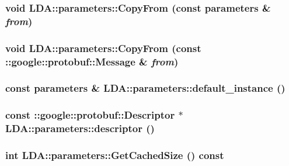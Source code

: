 \label{class_l_d_a_1_1parameters_ae528875970511c508f159074dcd3f25f}
\hypertarget{class_l_d_a_1_1parameters_aced52857cb4b43b1a500ef9f686bbfda}{
\subsubsection[{CopyFrom}]{\setlength{\rightskip}{0pt plus 5cm}void LDA::parameters::CopyFrom (const {\bf parameters} \& {\em from})}}
\label{class_l_d_a_1_1parameters_aced52857cb4b43b1a500ef9f686bbfda}
\hypertarget{class_l_d_a_1_1parameters_a9c63de970efdf555031d74daa4ba9bf7}{
\subsubsection[{CopyFrom}]{\setlength{\rightskip}{0pt plus 5cm}void LDA::parameters::CopyFrom (const ::google::protobuf::Message \& {\em from})}}
\label{class_l_d_a_1_1parameters_a9c63de970efdf555031d74daa4ba9bf7}
\hypertarget{class_l_d_a_1_1parameters_a9ad0369f1bc7da1c4bd9583063fd2460}{
\subsubsection[{default\_\-instance}]{\setlength{\rightskip}{0pt plus 5cm}const {\bf parameters} \& LDA::parameters::default\_\-instance ()}}
\label{class_l_d_a_1_1parameters_a9ad0369f1bc7da1c4bd9583063fd2460}
\hypertarget{class_l_d_a_1_1parameters_a6d42cf2ca9506e1ef58d9545f029a6d1}{
\subsubsection[{descriptor}]{\setlength{\rightskip}{0pt plus 5cm}const ::google::protobuf::Descriptor $\ast$ LDA::parameters::descriptor ()}}
\label{class_l_d_a_1_1parameters_a6d42cf2ca9506e1ef58d9545f029a6d1}
\hypertarget{class_l_d_a_1_1parameters_a2e64015d79045c906f04e0030cf19215}{
\subsubsection[{GetCachedSize}]{\setlength{\rightskip}{0pt plus 5cm}int LDA::parameters::GetCachedSize () const}}
